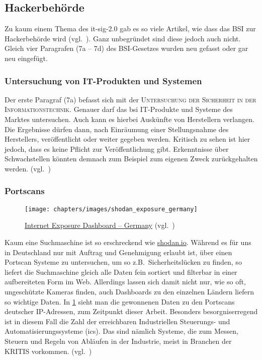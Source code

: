 \subsection{Hackerbehörde}\label{ssec:hackerbehorde}
Zu kaum einem Thema des \acrshort{it-sig-2.0} gab es so viele Artikel, wie dass das BSI zur Hackerbehörde wird
(vgl.~\cite{bsi-wird-zur-hackerbehoerde,it-sig-2.0-bundestag-baut-bsi-zur-hackerbehoerde-aus,seehofer-bsi-hackerbehoerde,entwurf-hackerbehoerde}).
Ganz unbegründet sind diese jedoch auch nicht.
Gleich vier Paragrafen (7a – 7d) des BSI-Gesetzes wurden neu gefasst oder gar neu eingefügt.

\subsubsection{Untersuchung von IT-Produkten und Systemen}\label{sssec:untersuchung-von-it-produkten-und-systemen}
Der erste Paragraf (7a) befasst sich mit der \textsc{Untersuchung der Sicherheit in der Informationstechnik}.
Genauer darf das \acrshort{bsi} IT-Produkte und Systeme des Marktes untersuchen.
Auch kann es hierbei Auskünfte von Herstellern verlangen.
Die Ergebnisse dürfen dann, nach Einräumung einer Stellungsnahme des Herstellers, veröffentlicht oder weiter gegeben werden.
Kritisch zu sehen ist hier jedoch, dass es keine Pflicht zur Veröffentlichung gibt.
Erkenntnisse über Schwachstellen könnten demnach zum Beispiel zum eigenen Zweck zurückgehalten werden.
(vgl.~\cite{neue-it-sig-2.0})

\subsubsection{Portscans}\label{sssec:portscans}
\begin{figure}[H]\centering
    \texttt{[image: chapters/images/shodan\_exposure\_germany]}
    \caption{\href{https://exposure.shodan.io/\#/DE/}{Internet Exposure Dashboard – Germany} (vgl.~\cite{shodan-dashboard-exposure-germany})}
    \label{fig:shodan-exposure-germany}
\end{figure}
Kaum eine Suchmaschine ist so erschreckend wie \href{https://www.shodan.io/}{shodan.io}.
Während es für uns in Deutschland nur mit Auftrag und Genehmigung erlaubt ist,
über einen Portscan Systeme zu untersuchen, um so z.B.\ Sicherheitslücken zu finden,
so liefert die Suchmaschine gleich alle Daten fein sortiert und filterbar in einer aufbereiteten Form im Web.
Allerdings lassen sich damit nicht nur, wie so oft, ungeschützte Kameras finden,
auch Dashboards zu den einzelnen Ländern liefern so wichtige Daten.
In \cref{fig:shodan-exposure-germany} sieht man die gewonnenen Daten zu den Portscans deutscher IP-Adressen,
zum Zeitpunkt dieser Arbeit.
Besonders besorgniserregend ist in diesem Fall die Zahl der erreichbaren
Industriellen Steuerungs- und Automatisierungssysteme (\acrshort{ics}).
Das sind nämlich Systeme, die zum Messen, Steuern und Regeln von Abläufen in der Industrie,
meist in Branchen der KRITIS vorkommen.
(vgl.~\cite{bsi-ics})

